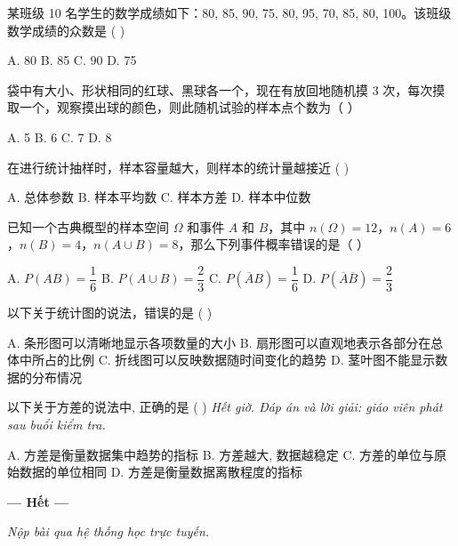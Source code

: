 \documentclass[11pt, a4paper]{article}
\begin{document}
\begin{baitap}[19]
某班级 10 名学生的数学成绩如下：80, 85, 90, 75, 80, 95, 70, 85, 80, 100。该班级数学成绩的众数是 ( )
\par\vspace{3pt}
\noindent A. 80 \quad B. 85 \quad C. 90 \quad D. 75
\end{baitap}

\begin{baitap}[20]
袋中有大小、形状相同的红球、黑球各一个，现在有放回地随机摸 3 次，每次摸取一个，观察摸出球的颜色，则此随机试验的样本点个数为（ ）
\par\vspace{3pt}
\noindent A. 5 \quad B. 6 \quad C. 7 \quad D. 8
\end{baitap}

\begin{baitap}[21]
在进行统计抽样时，样本容量越大，则样本的统计量越接近 ( )
\par\vspace{3pt}
\noindent A. 总体参数 \quad B. 样本平均数 \quad C. 样本方差 \quad D. 样本中位数
\end{baitap}

\begin{baitap}[22]
已知一个古典概型的样本空间 $\Omega$ 和事件 $A$ 和 $B$，其中 $n(\Omega) = 12$，$n(A) = 6$，$n(B) = 4$，$n(A \cup B) = 8$，那么下列事件概率错误的是（ ）
\par\vspace{3pt}
\noindent A. $P(AB) = \dfrac{1}{6}$ \quad B. $P(A \cup B) = \dfrac{2}{3}$ \quad C. $P(\overline{A}B) = \dfrac{1}{6}$ \quad D. $P(\overline{A}\overline{B}) = \dfrac{2}{3}$
\end{baitap}

\begin{baitap}[23]
以下关于统计图的说法，错误的是 ( )
\par\vspace{3pt}
\noindent A. 条形图可以清晰地显示各项数量的大小 \quad B. 扇形图可以直观地表示各部分在总体中所占的比例 \quad C. 折线图可以反映数据随时间变化的趋势 \quad D. 茎叶图不能显示数据的分布情况
\end{baitap}

\begin{baitap}[24]
以下关于方差的说法中, 正确的是 ( ) \emph{Hết giờ. Đáp án và lời giải: giáo viên phát sau buổi kiểm tra.}
\par\vspace{3pt}
\noindent A. 方差是衡量数据集中趋势的指标 \quad B. 方差越大, 数据越稳定 \quad C. 方差的单位与原始数据的单位相同 \quad D. 方差是衡量数据离散程度的指标
\end{baitap}

\vspace{0.5cm}
\begin{center}
\textbf{--- Hết ---}
\end{center}

\vspace{0.3cm}
\noindent\emph{Nộp bài qua hệ thống học trực tuyến.}
\end{document}
